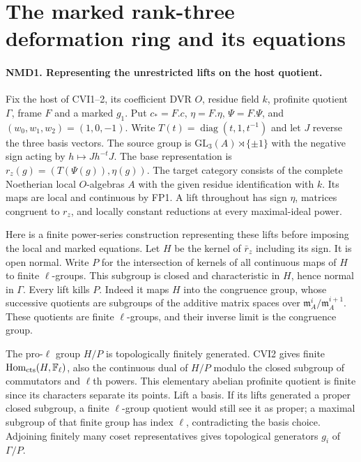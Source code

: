 \section{The marked rank-three deformation ring and its equations}
\label{sec:marked-native-ring}

\paragraph{NMD1. Representing the unrestricted lifts on the host quotient.}
\label{claim:NMD1}
Fix the host of CVI1--2, its coefficient DVR $O$, residue field $k$,
profinite quotient $\Gamma$, frame $F$ and a marked $g_1$. Put
$c_*=F.c$, $\eta=F.\eta$, $\Psi=F.\Psi$, and
$(w_0,w_1,w_2)=(1,0,-1)$. Write
$T(t)=\operatorname{diag}(t,1,t^{-1})$ and let $J$ reverse the three
basis vectors. The source group is
$\mathrm{GL}_3(A)\rtimes\{\pm1\}$ with the negative sign acting by
$h\mapsto J h^{-t}J$. The base representation is
$r_z(g)=(T(\Psi(g)),\eta(g))$. The target category consists of the
complete Noetherian local $O$-algebras $A$ with the given residue
identification with $k$. Its maps are local and continuous by FP1.
A lift throughout has sign $\eta$, matrices congruent to $r_z$,
and locally constant reductions at every maximal-ideal power.

Here is a finite power-series construction representing these lifts
before imposing the local and marked equations. Let $H$ be the
kernel of $\bar r_z$ including its sign. It is open normal. Write
$P$ for the intersection of kernels of all continuous maps of $H$ to
finite $\ell$-groups. This subgroup is closed and characteristic in
$H$, hence normal in $\Gamma$. Every lift kills $P$. Indeed it maps
$H$ into the congruence group, whose successive quotients are
subgroups of the additive matrix spaces over
$\mathfrak m_A^i/\mathfrak m_A^{i+1}$. These quotients are finite
$\ell$-groups, and their inverse limit is the congruence group.

The pro-$\ell$ group $H/P$ is topologically finitely generated.
CVI2 gives finite $\operatorname{Hom}_{\rm cts}(H,\mathbb F_\ell)$,
also the continuous dual of $H/P$ modulo the closed subgroup of
commutators and $\ell$th powers. This elementary abelian profinite
quotient is finite since its characters separate its points. Lift a
basis. If its lifts generated a proper closed subgroup, a finite
$\ell$-group quotient would still see it as proper; a maximal
subgroup of that finite group has index $\ell$, contradicting the
basis choice. Adjoining finitely many coset representatives gives
topological generators $g_i$ of $\Gamma/P$.


